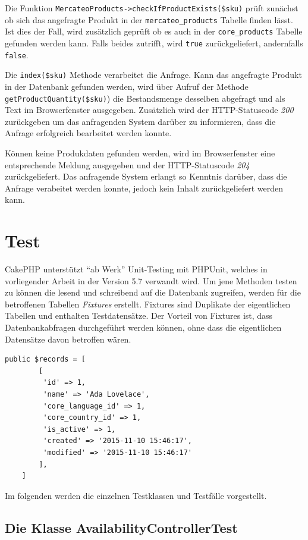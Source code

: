 {	Die Funktion \texttt{MercateoProducts->checkIfProductExists(\$sku)} prüft zunächst ob sich das angefragte Produkt in der \texttt{mercateo\_products} Tabelle finden lässt. Ist dies der Fall, wird zusätzlich geprüft ob es auch in der \texttt{core\_products} Tabelle gefunden werden kann. Falls beides zutrifft, wird \texttt{true} zurückgeliefert, andernfalls \texttt{false}.
	
	Die \texttt{index(\$sku)} Methode verarbeitet die Anfrage. Kann das angefragte Produkt in der Datenbank gefunden werden, wird über Aufruf der Methode \texttt{getProductQuantity(\$sku)}) die Bestandsmenge desselben abgefragt und als Text im Browserfenster ausgegeben. Zusätzlich wird der HTTP-Statuscode \textit{200} zurückgeben um das anfragenden System darüber zu informieren, dass die Anfrage erfolgreich bearbeitet werden konnte.
	
	Können keine Produkdaten gefunden werden, wird im Browserfenster eine entsprechende Meldung ausgegeben und der HTTP-Statuscode \textit{204} zurückgeliefert. Das anfragende System erlangt so Kenntnis darüber, dass die Anfrage verabeitet werden konnte, jedoch kein Inhalt zurückgeliefert werden kann.
	
	\section{Test}
	
	
	CakePHP unterstützt \enquote{ab Werk} Unit-Testing mit PHPUnit, welches in vorliegender Arbeit in der Version 5.7 verwandt wird. Um jene Methoden testen zu können die lesend und schreibend auf die Datenbank zugreifen, werden für die betroffenen Tabellen \textit{Fixtures} erstellt. Fixtures sind Duplikate der eigentlichen Tabellen und enthalten Testdatensätze. Der Vorteil von Fixtures ist, dass Datenbankabfragen durchgeführt werden können, ohne dass die eigentlichen Datensätze davon betroffen wären.
	\begin{lstlisting}[caption={Beispieleintrag in der Klasse \texttt{CoreSellersFixture}}]
	public $records = [
		[
		 'id' => 1,
		 'name' => 'Ada Lovelace',
		 'core_language_id' => 1,
		 'core_country_id' => 1,
		 'is_active' => 1,
		 'created' => '2015-11-10 15:46:17',
		 'modified' => '2015-11-10 15:46:17'
		],
	]
	\end{lstlisting}
	
	Im folgenden werden die einzelnen Testklassen und Testfälle vorgestellt.
	
	\subsection{Die Klasse AvailabilityControllerTest}
	
}

